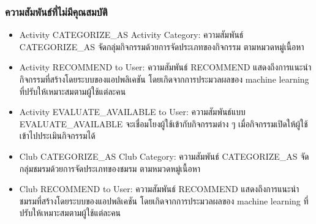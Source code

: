 \documentclass[14pt,oneside,openright,a4paper]{cpe-thai-project}
\begin{document}
      \subsubsection{ความสัมพันธ์ที่ไม่มีคุณสมบัติ}
        \normalsize
        \begin{itemize}
          \item Activity CATEGORIZE\_AS Activity Category: ความสัมพันธ์ CATEGORIZE\_AS จัดกลุ่มกิจกรรมด้วยการจัดประเภทของกิจกรรม ตามหมวดหมู่เนื้อหา
          \item Activity RECOMMEND to User: ความสัมพันธ์ RECOMMEND แสดงถึงการแนะนำกิจกรรมที่สร้างโดยระบบของแอปพลิเคชัน โดยเกิดจากการประมวลผลของ machine learning ที่ปรับให้เหมาะสมตามผู้ใช้แต่ละคน
          \item Activity EVALUATE\_AVAILABLE to User: ความสัมพันธ์แบบ EVALUATE\_AVAILABLE จะเชื่อมโยงผู้ใช้เข้ากับกิจกรรมต่าง ๆ เมื่อกิจกรรมเปิดให้ผู้ใช้เข้าไปประเมินกิจกรรมได้
          \item Club CATEGORIZE\_AS Club Category: ความสัมพันธ์ CATEGORIZE\_AS จัดกลุ่มชมรมด้วยการจัดประเภทของชมรม ตามหมวดหมู่เนื้อหา
          \item Club RECOMMEND to User: ความสัมพันธ์ RECOMMEND แสดงถึงการแนะนำชมรมที่สร้างโดยระบบของแอปพลิเคชัน โดยเกิดจากการประมวลผลของ machine learning ที่ปรับให้เหมาะสมตามผู้ใช้แต่ละคน
        \end{itemize}

\newpage
\end{document}
